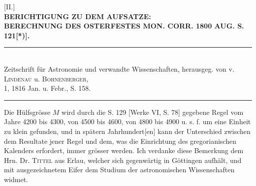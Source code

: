 \clearpage\begingroup\NoSourceHead{}
\begin{center}
{[II.]}\\[.8em]
\textbf{BERICHTIGUNG ZU DEM AUFSATZE:}\\[.4em]
\textbf{BERECHNUNG DES OSTERFESTES MON. CORR. 1800 AUG. S. 121[*)].}\\[.7em]
\rule{\textwidth}{.35pt}\\[.2em]
{\small Zeitschrift für Astronomie und verwandte Wissenschaften, herausgeg. von v. \textsc{Lindenau} u. \textsc{Bohnenberger},\\
1, 1816 Jan. u. Febr., S. 158.}\\[.2em]
\rule{\textwidth}{.35pt}
\end{center}
\begingroup\renewcommand{\thefootnote}{}\footnotetext{[*) Werke VI, S. 73.]}\endgroup
\noindent\hspace*{\parindent}Die Hülfsgrösse $M$ wird durch die S. 129 [Werke VI, S. 78] gegebene Regel vom Jahre 4200 bis 4300, von 4500 bis 4600, von 4800 bis 4900 u. s. f. um eine Einheit zu klein gefunden, und in spätern Jahrhundert[en] kann der Unterschied zwischen dem Resultate jener Regel und dem, was die Einrichtung des gregorianischen Kalenders erfordert, immer grösser werden. Ich verdanke diese Bemerkung dem Hrn. Dr. \textsc{Tittel} aus Erlau, welcher sich gegenwärtig in Göttingen aufhält, und mit ausgezeichnetem Eifer dem Studium der astronomischen Wissenschaften widmet.

